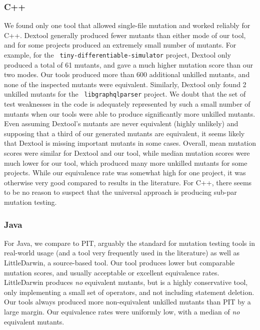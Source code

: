 \documentclass[acmsmall,screen,review,anonymous]{acmart}
\begin{document}
{\subsubsection{C++}

We found only one tool that allowed single-file mutation and worked
reliably for C++.  Dextool generally produced fewer mutants than
either mode of our tool, and for some projects produced an extremely
small number of mutants.  For example, for the {\tt
  tiny-differentiable-simulator} project, Dextool only produced a
total of 61 mutants, and gave a much higher mutation score than our
two modes.  Our tools produced more than 600 additional unkilled
mutants, and none of the inspected mutants were equivalent.
Similarly, Dextool only found 2 unkilled mutants for the {\tt
  libgraphqlparser} project.  We doubt that the set of test weaknesses
in the code is adequately represented by such a small number of
mutants when our tools were able to produce significantly more
unkilled mutants.  Even assuming Dextool's mutants are never
equivalent (highly unlikely) and supposing that a third of our
generated mutants are equivalent, it seems likely that Dextool is
missing important mutants in some cases.  Overall, mean mutation
scores were similar for Dextool and our tool, while
median mutation scores were much lower for our tool, which produced
many more unkilled mutants for some projects.  While our equivalence
rate was somewhat high for one project, it was otherwise very good
compared to results in the literature.  For C++, there seems to
be no reason to suspect that the universal approach is producing
sub-par mutation testing.

\subsubsection{Java}

For Java, we compare to PIT, arguably the standard for mutation
testing tools in real-world usage (and a tool very frequently used in
the literature) as well as LittleDarwin, a source-based tool.  Our
tool produces lower but comparable mutation scores, and usually
acceptable or excellent equivalence rates.  LittleDarwin produces
\emph{no} equivalent mutants, but is a highly conservative tool, only
implementing a small set of operators, and not including statement
deletion.  Our tools always produced more non-equivalent unkilled
mutants than PIT by a large margin.  Our equivalence rates were
uniformly low, with a median of \emph{no} equivalent mutants.

}
\end{document}
